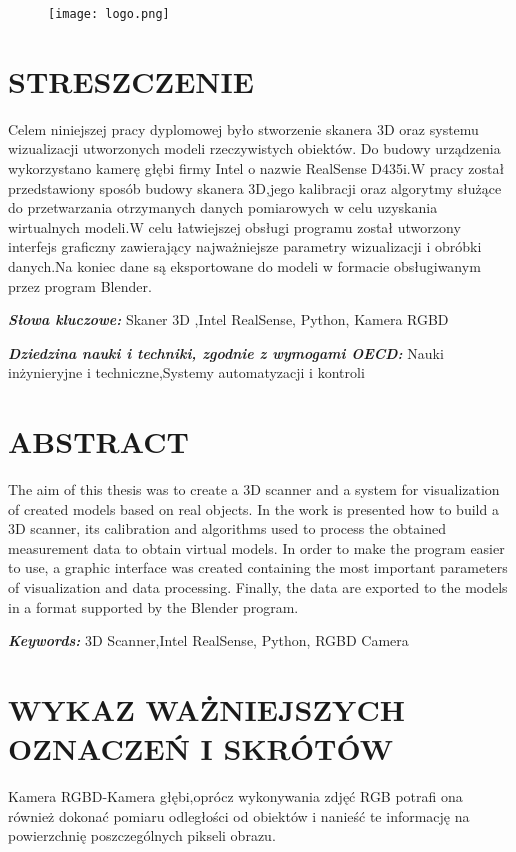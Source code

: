 \documentclass[12pt]{article}
\providecommand{\keywordspl}[1]
{
  \small	
  \textbf{\textit{Słowa kluczowe:}} #1
}
\providecommand{\keywordseng}[1]
{
  \small	
  \textbf{\textit{Keywords:}} #1
}
\providecommand{\dnauki}[1]
{
  \small	
  \textbf{\textit{Dziedzina nauki i techniki, zgodnie z wymogami OECD:}} #1
}
\begin{document}
\begin{figure}[H]
  \centering
  \texttt{[image: logo.png]}
  \label{fig:picture}
\end{figure}

\newpage

 
\section*{STRESZCZENIE}
Celem niniejszej pracy dyplomowej było stworzenie skanera 3D oraz systemu wizualizacji utworzonych modeli rzeczywistych obiektów. Do budowy urządzenia wykorzystano kamerę głębi firmy Intel o nazwie RealSense D435i.W pracy został przedstawiony sposób budowy skanera 3D,jego kalibracji oraz algorytmy służące do przetwarzania otrzymanych danych pomiarowych w celu uzyskania wirtualnych modeli.W celu łatwiejszej obsługi programu został utworzony interfejs graficzny zawierający najważniejsze parametry wizualizacji i obróbki danych.Na koniec dane są eksportowane do modeli w formacie obsługiwanym przez program Blender.

\keywordspl{Skaner 3D ,Intel RealSense, Python, Kamera RGBD}

\dnauki{Nauki inżynieryjne i techniczne,Systemy automatyzacji i kontroli }

\section*{ABSTRACT}
The aim of this thesis was to create a 3D scanner and a system for visualization of created models based on real objects. In the work is presented how to build a 3D scanner, its calibration and algorithms used to process the obtained measurement data to obtain virtual models. In order to make the program easier to use, a graphic interface was created containing the most important parameters of visualization and data processing. Finally, the data are exported to the models in a format supported by the Blender program.

\keywordseng{3D Scanner,Intel RealSense, Python, RGBD Camera}
\newpage
\tableofcontents





\newpage
\section{WYKAZ WAŻNIEJSZYCH OZNACZEŃ I SKRÓTÓW}

Kamera RGBD-Kamera głębi,oprócz wykonywania zdjęć RGB potrafi ona również dokonać pomiaru odległości od obiektów i nanieść te informację na powierzchnię poszczególnych pikseli obrazu.
\end{document}

